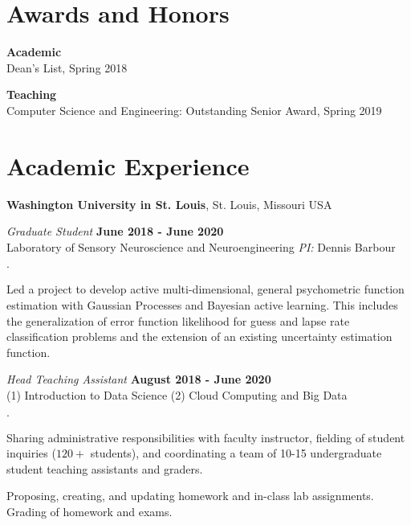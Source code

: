 \documentclass[line,margin]{res}
\newenvironment{list2}{
  \begin{list}{\boldmath$\cdot$}{%
      \setlength{\itemsep}{0in}
      \setlength{\parsep}{0in} \setlength{\parskip}{0in}
      \setlength{\topsep}{0in} \setlength{\partopsep}{0in}
      \setlength{\leftmargin}{0.2in}}}{\end{list}}
\begin{document}
\begin{resume}
\section{\sc Awards and Honors}
{\bf Academic} \vspace{0.3em} \\
Dean's List, Spring 2018

{\bf Teaching} \vspace{0.3em} \\
Computer Science and Engineering: Outstanding Senior Award, Spring 2019



\section{\sc Academic Experience}
{\bf Washington University in St. Louis}, St. Louis, Missouri USA \vspace{-0.7em}

{\em Graduate Student} \hfill {\bf June 2018 - June 2020} \\
Laboratory of Sensory Neuroscience and Neuroengineering {\it PI:} Dennis Barbour \\
\vspace*{-.1in}
\begin{list2}
\item Led a project to develop active multi-dimensional, general
psychometric function estimation with Gaussian Processes and Bayesian active
learning. This includes the generalization of error function likelihood for
guess and lapse rate classification problems and the extension of an existing
uncertainty estimation function.
\end{list2}

{\em Head Teaching Assistant} \hfill {\bf August 2018 - June 2020} \vspace{0.3em} \\
(1) Introduction to Data Science (2) Cloud Computing and Big Data \\
\vspace*{-.1in}
\begin{list2}
\item Sharing administrative responsibilities with faculty instructor,
fielding of student inquiries ($120+$ students), and coordinating a team
of 10-15 undergraduate student teaching assistants and graders.
\item Proposing, creating, and updating homework and in-class lab assignments. Grading of homework and exams.
\end{list2}


\end{resume}
\end{document}
